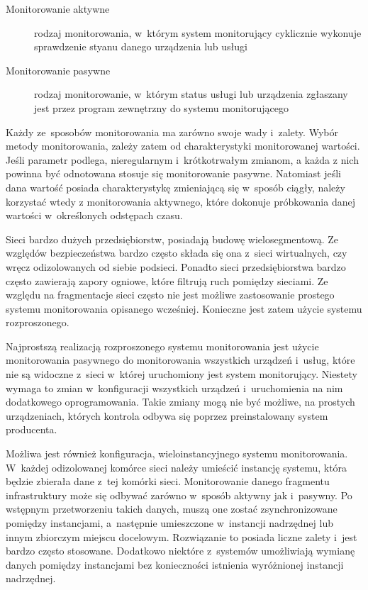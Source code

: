 \begin{description}
\item[Monitorowanie aktywne] rodzaj monitorowania, w~którym system
  monitorujący cyklicznie wykonuje sprawdzenie styanu danego
  urządzenia lub usługi
\item[Monitorowanie pasywne] rodzaj monitorowanie, w~którym status
  usługi lub urządzenia zgłaszany jest przez program zewnętrzny do
  systemu monitorującego
\end{description}

Każdy ze~sposobów monitorowania ma zarówno swoje wady i~zalety. Wybór
metody monitorowania, zależy zatem od charakterystyki monitorowanej
wartości. Jeśli parametr podlega, nieregularnym i~krótkotrwałym
zmianom, a każda z nich powinna być odnotowana stosuje się
monitorowanie pasywne. Natomiast jeśli dana wartość posiada
charakterystykę zmieniającą się w~sposób ciągły, należy korzystać
wtedy z monitorowania aktywnego, które dokonuje próbkowania danej
wartości w~określonych odstępach czasu.

Sieci bardzo dużych przedsiębiorstw, posiadają budowę
wielosegmentową. Ze względów bezpieczeństwa bardzo często składa się
ona z~sieci wirtualnych, czy wręcz odizolowanych od siebie
podsieci. Ponadto sieci przedsiębiorstwa bardzo często zawierają
zapory ogniowe, które filtrują ruch pomiędzy sieciami. Ze względu na
fragmentacje sieci często nie jest możliwe zastosowanie prostego
systemu monitorowania opisanego wcześniej. Konieczne jest zatem użycie
systemu rozproszonego.

Najprostszą realizacją rozproszonego systemu monitorowania jest użycie
monitorowania pasywnego do monitorowania wszystkich urządzeń i~usług,
które nie są widoczne z~sieci w~której uruchomiony jest system
monitorujący. Niestety wymaga to zmian w~konfiguracji wszystkich
urządzeń i~uruchomienia na nim dodatkowego oprogramowania. Takie
zmiany mogą nie być możliwe, na prostych urządzeniach, których
kontrola odbywa się poprzez preinstalowany system producenta. 

Możliwa jest również konfiguracja, wieloinstancyjnego systemu
monitorowania. W~każdej odizolowanej komórce sieci należy umieścić
instancję systemu, która będzie zbierała dane z~tej komórki
sieci. Monitorowanie danego fragmentu infrastruktury może się odbywać
zarówno w~sposób aktywny jak i~pasywny. Po wstępnym przetworzeniu
takich danych, muszą one zostać zsynchronizowane pomiędzy instancjami,
a~następnie umieszczone w~instancji nadrzędnej lub innym zbiorczym
miejscu docelowym. Rozwiązanie to posiada liczne zalety i~jest bardzo
często stosowane. Dodatkowo niektóre z~systemów umożliwiają wymianę
danych pomiędzy instancjami bez konieczności istnienia wyróżnionej
instancji nadrzędnej.

